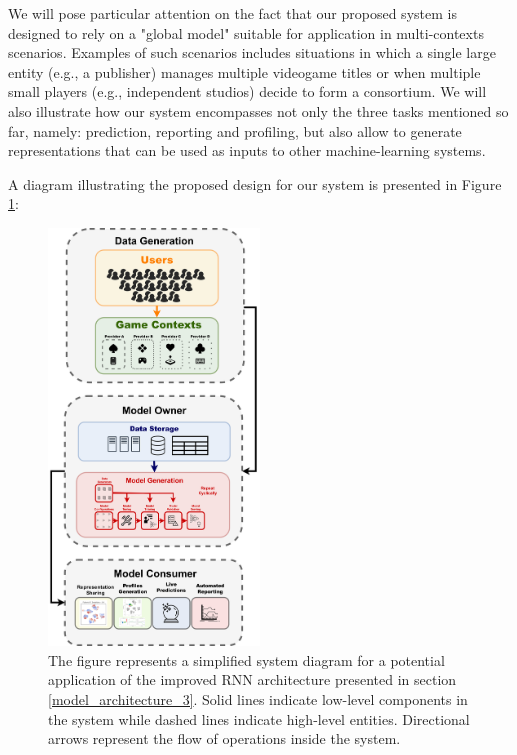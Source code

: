 We will pose particular attention on the fact that our proposed system is designed to rely on a "global model" \cite{wang2019deep} suitable for application in multi-contexts scenarios. Examples of such scenarios includes situations in which a single large entity (e.g., a publisher) manages multiple videogame titles or when multiple small players (e.g., independent studios) decide to form a consortium. We will also illustrate how our system encompasses not only the three tasks mentioned so far, namely: prediction, reporting and profiling, but also allow to generate representations that can be used as inputs to other machine-learning systems. 

A diagram illustrating the proposed design for our system is presented in Figure \ref{pipeline}:

\begin{figure}[ht]
\centering
\includegraphics[width=0.5\textwidth]{images/chapter_5/pipeline_diagram.png}
\caption[\textbf{Engagement Prediction and Quantification - System Design Diagram}]{The figure represents a simplified system diagram for a potential application of the improved RNN architecture presented in section \ref{model_architecture_3}. Solid lines indicate low-level components in the system while dashed lines indicate high-level entities. Directional arrows represent the flow of operations inside the system.}
\label{pipeline}
\end{figure}

